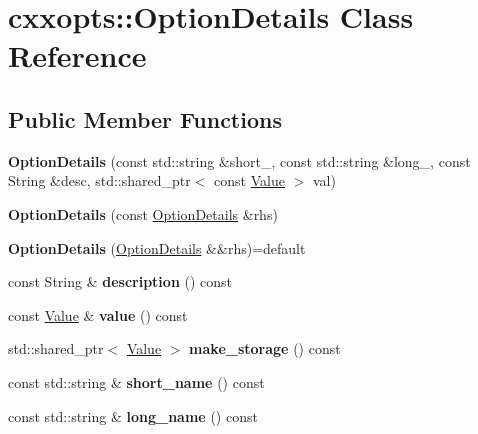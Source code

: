 \hypertarget{classcxxopts_1_1OptionDetails}{}\section{cxxopts\+:\+:Option\+Details Class Reference}
\label{classcxxopts_1_1OptionDetails}
\subsection*{Public Member Functions}
\begin{DoxyCompactItemize}
\item 
{\bfseries Option\+Details} (const std\+::string \&short\+\_\+, const std\+::string \&long\+\_\+, const String \&desc, std\+::shared\+\_\+ptr$<$ const \hyperlink{classcxxopts_1_1Value}{Value} $>$ val)\hypertarget{classcxxopts_1_1OptionDetails_a7d014c2b581711e47284eab3dcab375a}{}\label{classcxxopts_1_1OptionDetails_a7d014c2b581711e47284eab3dcab375a}

\item 
{\bfseries Option\+Details} (const \hyperlink{classcxxopts_1_1OptionDetails}{Option\+Details} \&rhs)\hypertarget{classcxxopts_1_1OptionDetails_a5837c0d007fd729347f594b1227648be}{}\label{classcxxopts_1_1OptionDetails_a5837c0d007fd729347f594b1227648be}

\item 
{\bfseries Option\+Details} (\hyperlink{classcxxopts_1_1OptionDetails}{Option\+Details} \&\&rhs)=default\hypertarget{classcxxopts_1_1OptionDetails_aecc7516afb809f71032168cbc5ee4036}{}\label{classcxxopts_1_1OptionDetails_aecc7516afb809f71032168cbc5ee4036}

\item 
const String \& {\bfseries description} () const \hypertarget{classcxxopts_1_1OptionDetails_ad2d2b36d4cbb2ebd8cae958f690eb7d1}{}\label{classcxxopts_1_1OptionDetails_ad2d2b36d4cbb2ebd8cae958f690eb7d1}

\item 
const \hyperlink{classcxxopts_1_1Value}{Value} \& {\bfseries value} () const \hypertarget{classcxxopts_1_1OptionDetails_a1313a2585d813c71eee4b1ac11adf6ba}{}\label{classcxxopts_1_1OptionDetails_a1313a2585d813c71eee4b1ac11adf6ba}

\item 
std\+::shared\+\_\+ptr$<$ \hyperlink{classcxxopts_1_1Value}{Value} $>$ {\bfseries make\+\_\+storage} () const \hypertarget{classcxxopts_1_1OptionDetails_a7f3f57710a3ab53c91c30c15a135d0c9}{}\label{classcxxopts_1_1OptionDetails_a7f3f57710a3ab53c91c30c15a135d0c9}

\item 
const std\+::string \& {\bfseries short\+\_\+name} () const \hypertarget{classcxxopts_1_1OptionDetails_a41b0a078383518f5417066f88e86d23b}{}\label{classcxxopts_1_1OptionDetails_a41b0a078383518f5417066f88e86d23b}

\item 
const std\+::string \& {\bfseries long\+\_\+name} () const \hypertarget{classcxxopts_1_1OptionDetails_a8693b5843ac0de2c4bc14eeeddea5f8f}{}\label{classcxxopts_1_1OptionDetails_a8693b5843ac0de2c4bc14eeeddea5f8f}

\end{DoxyCompactItemize}
